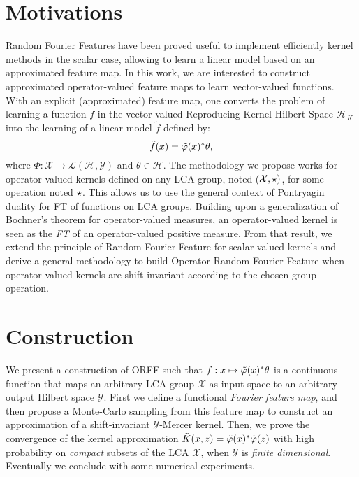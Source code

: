 \section{Motivations}
\label{sec:motivations}
Random Fourier Features have been proved useful to implement efficiently kernel methods in the scalar case, allowing to learn a linear model based on an approximated feature map. In this work, we are interested to construct approximated operator-valued feature maps to learn vector-valued functions. With an explicit (approximated) feature map, one converts the problem of learning a function $f$ in the vector-valued Reproducing Kernel Hilbert Space $\mathcal{H}_K$ into the learning of a linear model $\tilde{f}$ defined by:
 \begin{dmath*}
 \tilde{f}(x) = \tildePhi(x)^* \theta,
 \end{dmath*}
 where $\Phi: \mathcal{X} \to \mathcal{L}(\mathcal{H},\mathcal{Y})$ and $\theta \in \mathcal{H}$. The methodology we propose works for operator-valued kernels defined on any \acf{LCA} group, noted ($\mathcal{X}, \star)$, for some operation noted $\star$. This allows us to use the general context of Pontryagin duality for \acl{FT} of functions on \acs{LCA} groups. Building upon a generalization of Bochner's theorem for operator-valued measures, an operator-valued kernel is seen as the \emph{\acl{FT}} of an operator-valued positive measure. From that result, we extend the principle of Random Fourier Feature for scalar-valued kernels and derive a general methodology to build Operator Random Fourier Feature when operator-valued kernels are shift-invariant according to the chosen group operation.

\section{Construction}
\label{sec:construction}
We present a construction of \acf{ORFF} such that $f: x\mapsto \tildePhi(x)^*\theta$ is a continuous function that maps an arbitrary \acs{LCA} group $\mathcal{X}$ as input space to an arbitrary output Hilbert space $\mathcal{Y}$. First we define a functional \emph{Fourier feature map}, and then propose a Monte-Carlo sampling from this feature map to construct an approximation of a shift-invariant $\mathcal{Y}$-Mercer kernel.
Then, we prove the convergence of the kernel approximation $\tilde{K}(x,z)=\tildePhi(x)^*\tildePhi(z)$ with high probability on \emph{compact} subsets of the \acs{LCA} $\mathcal{X}$, when $\mathcal{Y}$ is \emph{finite dimensional}. Eventually we conclude with some numerical experiments.
